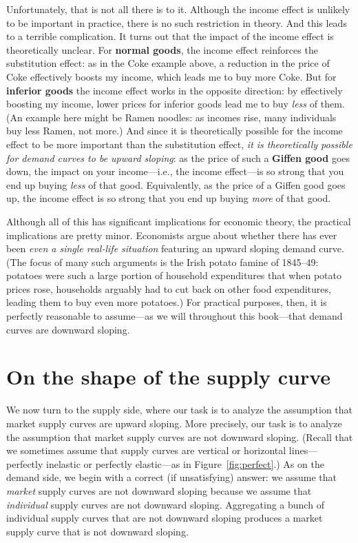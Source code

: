 Unfortunately, that is not all there is to it. Although the income effect is unlikely to be important in practice, there is no such restriction in theory. And this leads to a terrible complication. It turns out that the impact of the income effect is theoretically unclear. For \textbf{normal goods}, the income effect reinforces the substitution effect: as in the Coke example above, a reduction in the price of Coke effectively boosts my income, which leads me to buy more Coke. But for \textbf{inferior goods} the income effect works in the opposite direction: by effectively boosting my income, lower prices for inferior goods lead me to buy \emph{less} of them. (An example here might be Ramen noodles: as incomes rise, many individuals buy less Ramen, not more.) And since it is theoretically possible for the income effect to be more important than the substitution effect, \emph{it is theoretically possible for demand curves to be upward sloping}: as the price of such a \textbf{Giffen good} goes down, the impact on your income---i.e., the income effect---is so strong that you end up buying \emph{less} of that good. Equivalently, as the price of a Giffen good goes up, the income effect is so strong that you end up buying \emph{more} of that good.

Although all of this has significant implications for economic theory, the practical implications are pretty minor. Economists argue about whether there has ever been \emph{even a single real-life situation} featuring an upward sloping demand curve. (The focus of many such arguments is the Irish potato famine of 1845--49: potatoes were such a large portion of household expenditures that when potato prices rose, households arguably had to cut back on other food expenditures, leading them to buy even more potatoes.) For practical purposes, then, it is perfectly reasonable to assume---as we will throughout this book---that demand curves are downward sloping.





\section{On the shape of the supply curve}

We now turn to the supply side, where our task is to analyze the assumption that market supply curves are upward sloping. More precisely, our task is to analyze the assumption that market supply curves are not downward sloping. (Recall that we sometimes assume that supply curves are vertical or horizontal lines---perfectly inelastic or perfectly elastic---as in Figure~\ref{fig:perfect}.) As on the demand side, we begin with a correct (if unsatisfying) answer: we assume that \emph{market} supply curves are not downward sloping because we assume that \emph{individual} supply curves are not downward sloping. Aggregating a bunch of individual supply curves that are not downward sloping produces a market supply curve that is not downward sloping.

